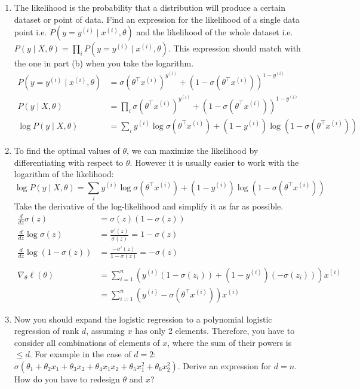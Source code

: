 \documentclass[a4paper]{scrartcl}
\begin{document}
\begin{enumerate}[label=(\alph*)]
	\item The likelihood is the probability that a distribution will produce a certain dataset or point of data. Find an expression for the likelihood of a single data point i.e. $P(y = y^{(i)} \mid x^{(i)}, \theta)$ and the likelihood of the whole dataset i.e. $P(y \mid X, \theta) = \prod_i P(y = y^{(i)} \mid x^{(i)}, \theta)$. This expression should match with the one in part (b) when you take the logarithm. \\
		\begin{align*}
			P(y = y^{(i)} \mid x^{(i)}, \theta) &= \sigma(\theta^\top x^{(i)})^{y^{(i)}} + (1 - \sigma(\theta^\top x^{(i)}))^{1-y^{(i)}} \\
			P(y \mid X, \theta) &= \prod_i \sigma(\theta^\top x^{(i)})^{y^{(i)}} + (1 - \sigma(\theta^\top x^{(i)}))^{1-y^{(i)}} \\
			\log P(y \mid X, \theta) &= \sum_i y^{(i)} \log \sigma(\theta^\top x^{(i)}) + (1-y^{(i)}) \log (1 - \sigma(\theta^\top x^{(i)}))
		\end{align*}
	\item  To find the optimal values of $\theta$, we can maximize the likelihood by differentiating with respect to $\theta$. However it is usually easier to work with the logarithm of the likelihood: $$ \log P(y \mid X, \theta) = \sum_i y^{(i)} \log \sigma(\theta^\top x^{(i)}) + (1 - y^{(i)}) \log ( 1 - \sigma(\theta^\top x^{(i)}) ) $$ Take the derivative of the log-likelihood and simplify it as far as possible. \\
		\begin{align*}
			\frac{d}{dz} \sigma(z) &= \sigma(z) (1-\sigma(z)) \\ \frac{d}{dz} \log \sigma(z) &= \frac{\sigma'(z)}{\sigma(z)} = 1-\sigma(z) \\ \frac{d}{dz} \log (1-\sigma(z)) &= \frac{-\sigma'(z)}{1-\sigma(z)} = -\sigma(z) \\ \\ 
			\nabla_\theta \ell(\theta) &= \sum_{i=1}^n \left( y^{(i)} ( 1 - \sigma(z_i) ) + ( 1 - y^{(i)} ) ( -\sigma(z_i) ) \right) x^{(i)} \\
			&= \sum_{i=1}^n ( y^{(i)} - \sigma ( \theta^\top x^{(i)} ) )  x^{(i)}
		\end{align*}
	\item  Now you should expand the logistic regression to a polynomial logistic regression of rank $d$, assuming $x$ has only 2 elements. Therefore, you have to consider all combinations of elements of $x$, where the sum of their powers is $\leq d$. For example in the case of $d=2$: $\sigma( \theta_1 + \theta_2 x_1 + \theta_3 x_2 + \theta_4 x_1 x_2 + \theta_5 x_1^2 + \theta_6 x_2^2)$. Derive an expression for $d = n$. How do you have to redesign $\theta$ and $x$?
\end{enumerate}
\end{document}
